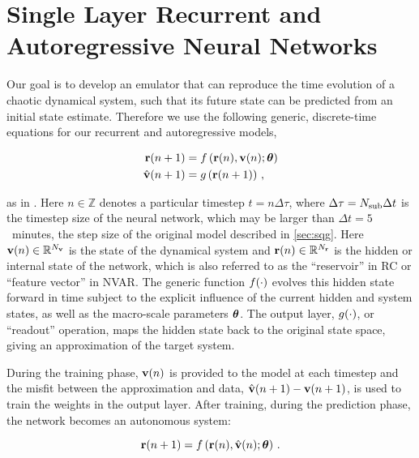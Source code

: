 \section{Single Layer Recurrent and Autoregressive Neural Networks}
\label{sec:rnn-architecture}

Our goal is to develop an emulator that can reproduce the time evolution of a chaotic dynamical system, such that its future state can be predicted from an initial
state estimate.
Therefore we use the following generic, discrete-time equations for our recurrent and autoregressive models,
\begin{linenomath*}\begin{equation}
    \begin{aligned}
        \mathbf{r}(n+1) &= f\left(
            \mathbf{r}(n), \mathbf{v}(n); \bm{\theta}
            \right) \\
        \hat{\mathbf{v}}(n+1) &= g \left( \mathbf{r}(n+1) \right) \, ,
    \end{aligned}
    \label{eq:rnn}
\end{equation}\end{linenomath*}
as in \citet{goodfellow_sequence_2016}.
Here $n\in\mathbb{Z}$ denotes a particular timestep $t = n\Delta \tau$, where $\Delta\tau = N_\text{sub}\Delta t$ is the timestep size of the neural network,
which may be larger than $\Delta t=5$~minutes, the step size of the original model described in
\cref{sec:sqg}.
Here $\mathbf{v}(n)\in\mathbb{R}^{N_{\mathbf{v}}}$ is the state of the dynamical system and $\mathbf{r}(n)\in\mathbb{R}^{N_{\mathbf{r}}}$ is the hidden or internal state of the network, which is also referred to as the ``reservoir'' in RC or ``feature vector'' in
NVAR.
The generic function $f(\cdot)$ evolves this hidden state forward in
time subject to the explicit
influence of the current hidden and system states, as well as the macro-scale
parameters $\bm{\theta}$.
The output layer,
$g(\cdot)$, or ``readout'' operation,
maps the hidden state back to the original state space, giving an
approximation of the target system.

During the training phase, $\mathbf{v}(n)$ is provided to the model at each timestep
and the misfit between the approximation and data,
$\hat{\mathbf{v}}(n+1) - \mathbf{v}(n+1)$, is used to train the weights in the output
layer.
After training, during the prediction phase, the network becomes an autonomous
system:
\begin{linenomath*}\begin{equation*}
    \mathbf{r}(n+1) = f\left(
        \mathbf{r}(n), \hat{\mathbf{v}}(n); \bm{\theta}\right) \, .
\end{equation*}\end{linenomath*}

